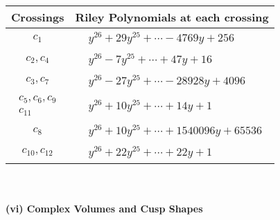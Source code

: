 \documentclass[1p]{elsarticle_modified}
\theoremstyle{definition}
\begin{document}
\begin{tabular}{m{50pt}|m{274pt}}
Crossings & \hspace{64pt}Riley Polynomials at each crossing \\
\hline $$\begin{aligned}c_{1}\end{aligned}$$&$\begin{aligned}
&y^{26}+29 y^{25}+\cdots-4769 y+256
\end{aligned}$\\
\hline $$\begin{aligned}c_{2},c_{4}\end{aligned}$$&$\begin{aligned}
&y^{26}-7 y^{25}+\cdots+47 y+16
\end{aligned}$\\
\hline $$\begin{aligned}c_{3},c_{7}\end{aligned}$$&$\begin{aligned}
&y^{26}-27 y^{25}+\cdots-28928 y+4096
\end{aligned}$\\
\hline $$\begin{aligned}c_{5},c_{6},c_{9}\\c_{11}\end{aligned}$$&$\begin{aligned}
&y^{26}+10 y^{25}+\cdots+14 y+1
\end{aligned}$\\
\hline $$\begin{aligned}c_{8}\end{aligned}$$&$\begin{aligned}
&y^{26}+10 y^{25}+\cdots+1540096 y+65536
\end{aligned}$\\
\hline $$\begin{aligned}c_{10},c_{12}\end{aligned}$$&$\begin{aligned}
&y^{26}+22 y^{25}+\cdots+22 y+1
\end{aligned}$\\
\hline
\end{tabular}\\~\\
\newpage\flushleft \textbf{(vi) Complex Volumes and Cusp Shapes}
\end{document}
